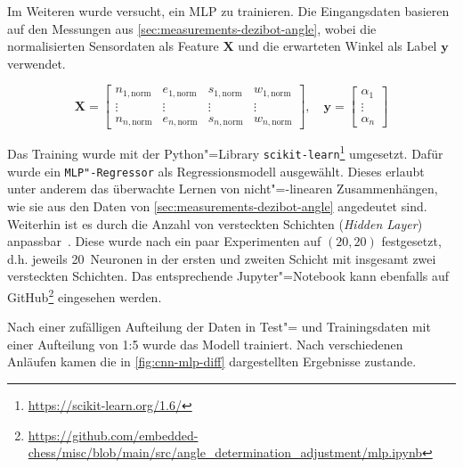 {%

Im Weiteren wurde versucht, ein MLP zu trainieren. Die Eingangsdaten basieren auf den Messungen aus \autoref{sec:measurements-dezibot-angle}, wobei die normalisierten Sensordaten als Feature $\mathbf{X}$ und die erwarteten Winkel als Label $\mathbf{y}$ verwendet.

\begin{equation*}
    \mathbf{X} = \begin{bmatrix}
        n_{1,\text{norm}} & e_{1,\text{norm}} & s_{1,\text{norm}} & w_{1,\text{norm}} \\
        \vdots & \vdots & \vdots & \vdots \\
        n_{n,\text{norm}} & e_{n,\text{norm}} & s_{n,\text{norm}} & w_{n,\text{norm}}
    \end{bmatrix},
    \quad \mathbf{y} = \begin{bmatrix}
        \alpha_1 \\ \vdots \\ \alpha_n
    \end{bmatrix}
\end{equation*}

Das Training wurde mit der Python"=Library \texttt{scikit-learn}\footnote{\url{https://scikit-learn.org/1.6/}} umgesetzt. Dafür wurde ein \texttt{MLP"-Regressor} als Regressionsmodell ausgewählt. Dieses erlaubt unter anderem das überwachte Lernen von nicht"=-linearen Zusammenhängen, wie sie aus den Daten von \autoref{sec:measurements-dezibot-angle} angedeutet sind. Weiterhin ist es durch die Anzahl von versteckten Schichten (\emph{Hidden Layer}) anpassbar~\cite{scikit-learndevelopers117NeuralNetwork2025}. Diese wurde nach ein paar Experimenten auf $(20,20)$ festgesetzt, d.h. jeweils 20~Neuronen in der ersten und zweiten Schicht mit insgesamt zwei versteckten Schichten. Das entsprechende Jupyter"=Notebook kann ebenfalls auf GitHub\footnote{\url{https://github.com/embedded-chess/misc/blob/main/src/angle_determination_adjustment/mlp.ipynb}} eingesehen werden.

Nach einer zufälligen Aufteilung der Daten in Test"= und Trainingsdaten mit einer Aufteilung von 1:5 wurde das Modell trainiert. Nach verschiedenen Anläufen kamen die in \autoref{fig:cnn-mlp-diff} dargestellten Ergebnisse zustande.

}
